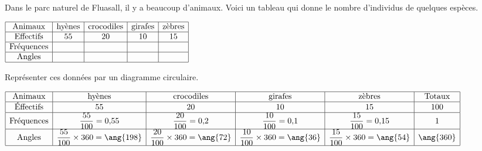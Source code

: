 \begin{corrige}
    Dans le parc naturel de Fluasall, il y a beaucoup d'animaux.
    Voici un tableau qui donne le nombre d'individus de quelques espèces.

    \medskip
    $
    \begin{array}{|c|c|c|c|c|}
    \hline
    \text{Animaux} & \text{hyènes} & \text{crocodiles} & \text{girafes} & \text{zèbres}\\
    \hline
    \text{Effectifs} & 55 & 20 & 10 & 15\\
    \hline
    \text{Fréquences} &   &   &   &  \\
    \hline
    \text{Angles} &   &   &   &  \\
    \hline
    \end{array}
    $


    \medskip
    Représenter ces données par un diagramme circulaire.

    \smallskip
    {\red
    	$\renewcommand{\arraystretch}{1}
        \begin{array}{|c|c|c|c|c|c|}
        \hline
        \text{Animaux} & \text{hyènes} & \text{crocodiles} & \text{girafes} & \text{zèbres} & \text{Totaux}\\
        \hline
        \text{Éffectifs} & 55 & 20 & 10 & 15 & 100\\
        \hline
        \text{Fréquences} & \dfrac{55}{100}=0{,}55 & \dfrac{20}{100}=0{,}2 & \dfrac{10}{100}=0{,}1 & \dfrac{15}{100}=0{,}15 & 1\\
        \hline
        \text{Angles} & \dfrac{55}{100} \times 360 = \ang{198} & \dfrac{20}{100} \times 360 = \ang{72} & \dfrac{10}{100} \times 360 = \ang{36} & \dfrac{15}{100} \times 360 = \ang{54} & \ang{360}\\
        \hline
        \end{array}
        \renewcommand{\arraystretch}{1}$
        
        \bigskip
        \begin{tikzpicture}[baseline,scale=0.5]


\end{tikzpicture}}
\end{corrige}
